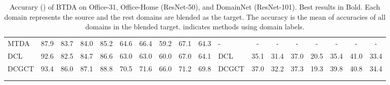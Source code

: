 \documentclass[letterpaper]{article} \usepackage{aaai23}  \usepackage{times}  \usepackage{helvet}  \usepackage{courier}  \usepackage[hyphens]{url}  \usepackage{graphicx} \urlstyle{rm} \def\UrlFont{\rm}  \usepackage{natbib}  \usepackage{caption} \frenchspacing  \setlength{\pdfpagewidth}{8.5in}  \setlength{\pdfpageheight}{11in}
\begin{document}
\begin{table*}[t]
{\begin{tabular}{@{}llcccccccccllccccccc@{}}
\multicolumn{2}{l}{MTDA}     & 87.9     & 83.7     & 84.0     & \multicolumn{1}{c|}{85.2}    & 64.6      & 66.4    & 59.2    & 67.1     & \multicolumn{1}{c|}{64.3}     & \multicolumn{2}{l}{-}       & -        & -      & -      & -       & -     & -      & -       \\
\multicolumn{2}{l}{DCL}    & 92.6    & 82.5    & 84.7  & \multicolumn{1}{c|}{86.6}     & 63.0    & 63.0     & 60.0     & 67.0    & \multicolumn{1}{c|}{64.1}          & \multicolumn{2}{l}{DCL}        & 35.1        & 31.4        & 37.0        & 20.5     & 35.4     & 41.0        & 33.4          \\
\multicolumn{2}{l}{DCGCT}    & 93.4     & 86.0    & 87.1    & \multicolumn{1}{c|}{88.8}   & 70.5      & 71.6         & 66.0         & 71.2         & \multicolumn{1}{c|}{69.8}          & \multicolumn{2}{l}{DCGCT}      & 37.0                 & 32.2                 & 37.3                 & 19.3                 & 39.8                 & 40.8                 & 34.4                 \\ \midrule
                      &                      & \multicolumn{1}{l}{} & \multicolumn{1}{l}{} & \multicolumn{1}{l}{} & \multicolumn{1}{l}{}               & \multicolumn{1}{l}{} & \multicolumn{1}{l}{} & \multicolumn{1}{l}{} & \multicolumn{1}{l}{} & \multicolumn{1}{l}{}               &                       &                      & \multicolumn{1}{l}{} & \multicolumn{1}{l}{} & \multicolumn{1}{l}{} & \multicolumn{1}{l}{} & \multicolumn{1}{l}{} & \multicolumn{1}{l}{} & \multicolumn{1}{l}{} \\
                      &                      & \multicolumn{1}{l}{} & \multicolumn{1}{l}{} & \multicolumn{1}{l}{} & \multicolumn{1}{l}{}               & \multicolumn{1}{l}{} & \multicolumn{1}{l}{} & \multicolumn{1}{l}{} & \multicolumn{1}{l}{} & \multicolumn{1}{l}{}               &                       &                      & \multicolumn{1}{l}{} & \multicolumn{1}{l}{} & \multicolumn{1}{l}{} & \multicolumn{1}{l}{} & \multicolumn{1}{l}{} & \multicolumn{1}{l}{} & \multicolumn{1}{l}{}
\end{tabular}
}
\vspace{-0.8cm}
\caption{Accurary () of BTDA on Office-31, Office-Home (ResNet-50), and  DomainNet (ResNet-101). Best results in Bold. Each domain represents the source and the rest domains are blended as the target. The accuracy is the mean of accuracies of all domains in the blended target. \dag indicates methods using domain labels.}
\label{btda_all}
\end{table*}
\end{document}
